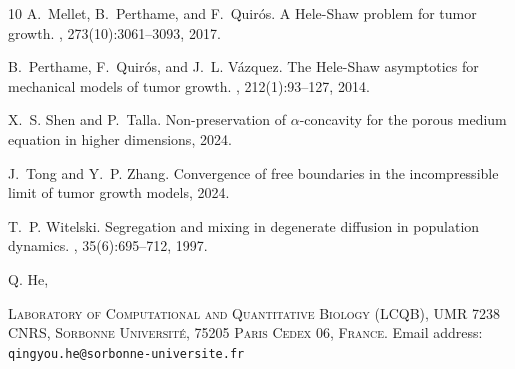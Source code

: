 \documentclass[10pt]{article}         %
\numberwithin{equation}{section}
\begin{document}
\begin{thebibliography}{10}
A.~Mellet, B.~Perthame, and F.~Quir\'{o}s.
\newblock A {H}ele-{S}haw problem for tumor growth.
, 273(10):3061--3093, 2017.

B.~Perthame, F.~Quir\'{o}s, and J.~L. V\'{a}zquez.
\newblock The {H}ele-{S}haw asymptotics for mechanical models of tumor growth.
, 212(1):93--127, 2014.

X.~S. Shen and P.~Talla.
\newblock Non-preservation of $\alpha$-concavity for the porous medium equation
  in higher dimensions, 2024.

J.~Tong and Y.~P. Zhang.
\newblock Convergence of free boundaries in the incompressible limit of tumor
  growth models, 2024.

T.~P. Witelski.
\newblock Segregation and mixing in degenerate diffusion in population
  dynamics.
, 35(6):695--712, 1997.

\end{thebibliography}

%
%




\vspace{4mm}

\noindent Q. He,\par\nopagebreak
\noindent\textsc{Laboratory of Computational and Quantitative Biology (LCQB), UMR 7238 CNRS, Sorbonne Universit\'e, 75205 Paris Cedex 06, France.}\newline
Email address: {\tt qingyou.he@sorbonne-universite.fr}
\end{document}
